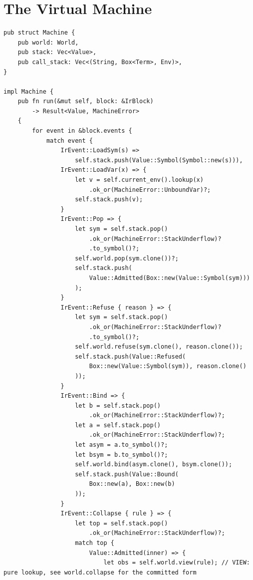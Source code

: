 \documentclass[12pt, a4paper, openany]{book}
\theoremstyle{plain}
\theoremstyle{definition}
\theoremstyle{remark}
\begin{document}
\section{The Virtual Machine}

\begin{lstlisting}[style=rust, caption={The Spherepop VM}]
pub struct Machine {
    pub world: World,
    pub stack: Vec<Value>,
    pub call_stack: Vec<(String, Box<Term>, Env)>,
}

impl Machine {
    pub fn run(&mut self, block: &IrBlock)
        -> Result<Value, MachineError>
    {
        for event in &block.events {
            match event {
                IrEvent::LoadSym(s) =>
                    self.stack.push(Value::Symbol(Symbol::new(s))),
                IrEvent::LoadVar(x) => {
                    let v = self.current_env().lookup(x)
                        .ok_or(MachineError::UnboundVar)?;
                    self.stack.push(v);
                }
                IrEvent::Pop => {
                    let sym = self.stack.pop()
                        .ok_or(MachineError::StackUnderflow)?
                        .to_symbol()?;
                    self.world.pop(sym.clone())?;
                    self.stack.push(
                        Value::Admitted(Box::new(Value::Symbol(sym)))
                    );
                }
                IrEvent::Refuse { reason } => {
                    let sym = self.stack.pop()
                        .ok_or(MachineError::StackUnderflow)?
                        .to_symbol()?;
                    self.world.refuse(sym.clone(), reason.clone());
                    self.stack.push(Value::Refused(
                        Box::new(Value::Symbol(sym)), reason.clone()
                    ));
                }
                IrEvent::Bind => {
                    let b = self.stack.pop()
                        .ok_or(MachineError::StackUnderflow)?;
                    let a = self.stack.pop()
                        .ok_or(MachineError::StackUnderflow)?;
                    let asym = a.to_symbol()?;
                    let bsym = b.to_symbol()?;
                    self.world.bind(asym.clone(), bsym.clone());
                    self.stack.push(Value::Bound(
                        Box::new(a), Box::new(b)
                    ));
                }
                IrEvent::Collapse { rule } => {
                    let top = self.stack.pop()
                        .ok_or(MachineError::StackUnderflow)?;
                    match top {
                        Value::Admitted(inner) => {
                            let obs = self.world.view(rule); // VIEW: pure lookup, see world.collapse for the committed form

\end{lstlisting}
\end{document}
